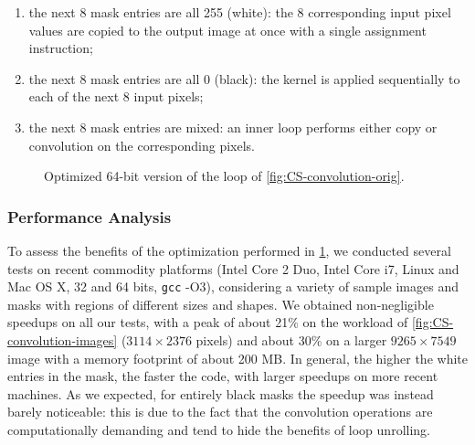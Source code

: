 \begin{enumerate}[itemsep=0pt,parsep=3pt]
\item the next 8 mask entries are all 255 (white): the 8 corresponding input pixel values are copied to the output image at once with a single assignment instruction;
\item the next 8 mask entries are all 0 (black): the kernel is applied sequentially to each of the next 8 input pixels;
\item the next 8 mask entries are mixed: an inner loop performs either copy or convolution on the corresponding pixels.
\end{enumerate}

\begin{figure}[!ht]
\centering
\cprotect{}
\vspace{-2mm}
\caption{Optimized 64-bit version of the loop of \myfigure\ref{fig:CS-convolution-orig}.}
\label{fig:CS-convolution-opt}
\end{figure}

\subsubsection*{Performance Analysis}
To assess the benefits of the optimization performed in \myfigure\ref{fig:CS-convolution-opt}, we conducted several tests on recent commodity platforms (Intel Core 2 Duo, Intel Core i7, Linux and Mac OS X, 32 and 64 bits, {\tt gcc} -O3), considering a variety of sample images and masks with regions of different sizes and shapes. We obtained non-negligible speedups on all our tests, with a peak of about 21\% on the workload of \myfigure\ref{fig:CS-convolution-images} ($3114\times2376$ pixels) and about 30\% on a larger $9265\times7549$ image with a memory footprint of about 200 MB. In general, the higher the white entries in the mask, the faster the code, with larger speedups on more recent machines. As we expected, for entirely black masks the speedup was instead barely noticeable: this is due to the fact that the convolution operations are computationally demanding and tend to hide the benefits of loop unrolling.

